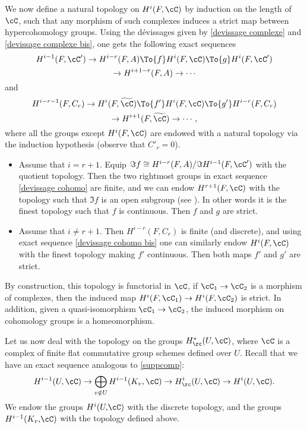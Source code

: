 We now define a natural topology on $H^i(F, \cC)$ by induction on the length of $\cC$, such that any morphism of such complexes induces a strict map between hypercohomology groups. Using the dévissages given by \eqref{devissage complexe} and \eqref{devissage complexe bis}, one gets the following exact sequences\vspace*{-3pt}
\begin{multline} \label{devissage cohomo}
H^{i-1}(F, \cC') \to H^{i-r}(F,A) \To{f} H^i(F, \cC) \To{g} H^i(F, \cC')\\ \to H^{i+1-r}(F,A) \to \cdots\vspace*{-3pt}
\end{multline}
and\vspace*{-3pt}
\begin{multline} \label{devissage cohomo bis}
H^{i-r-1}(F, C_r) \to H^{i}(F,\widetilde{\cC}) \To{f'} H^i(F, \cC) \To{g'} H^{i-r}(F, C_r)\\ \to H^{i+1}(F,\widetilde{\cC}) \to \cdots,\vspace*{-3pt}
\end{multline}
where all the groups except $H^i(F, \cC)$ are endowed with a
natural topology via the induction hypothesis (observe that $C'_r=0$).
\begin{itemize}
\item Assume that $i = r+1$. Equip $\Im f\cong H^{i-r}(F,A)/
\Im H^{i-1}(F, \cC')$ with the quotient topology.
Then the two rightmost groups in exact sequence \eqref{devissage cohomo} are finite, and we can endow $H^{r+1}(F, \cC)$ with the topology such that
$\Im f$ is an open subgroup (see \cite[beginning of \S 3]{DemH}).
In other words it is the
finest topology such that $f$ is continuous. Then $f$ and $g$ are strict.
\item Assume that $i \neq r+1$. Then $H^{i-r}(F,C_r)$ is finite (and discrete), and using exact sequence \eqref{devissage cohomo bis} one can similarly
endow $H^i(F, \cC)$ with the finest topology making $f'$ continuous. Then both maps $f'$ and $g'$ are strict.
\end{itemize}
By construction, this topology is functorial in $\cC$, \ie if $\cC_1 \to \cC_2$ is a morphism of complexes, then the induced map $H^i(F, \cC_1) \to H^i(F, \cC_2)$ is strict. In addition, given a quasi-isomorphism $\cC_1 \to \cC_2$, the induced morphism on cohomology groups is a homeomorphism.

Let us now deal with the topology on the groups $H^*_\rc(U, \cC)$, where $\cC$ is a complex of finite flat commutative group schemes defined over $U$. Recall that we have an exact sequence analogous to \eqref{suppcomp}:
\begin{equation} \label{long exact seq compact supp}
H^{i-1}(U,\cC) \to \bigoplus_{v \notin U} H^{i-1}(K_v,\cC) \to H^{i}_\rc(U,\cC) \to H^{i}(U,\cC).
\end{equation}
We endow the groups $H^{i}(U,\!\cC)$ with the discrete topology, and the groups~$H^{i-1}(K_v,\!\cC)$ with the topology defined above.

